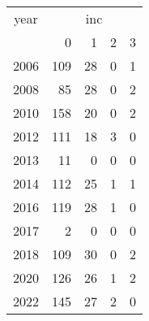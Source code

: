 \footnotesize\begin{tabular}[t]{lrrrr}
\toprule
\multicolumn{1}{c}{year} & \multicolumn{4}{c}{inc} \\
\cmidrule(l{3pt}r{3pt}){1-1} \cmidrule(l{3pt}r{3pt}){2-5}
  & 0 & 1 & 2 & 3\\
\midrule
2006 & 109 & 28 & 0 & 1\\
2008 & 85 & 28 & 0 & 2\\
2010 & 158 & 20 & 0 & 2\\
2012 & 111 & 18 & 3 & 0\\
2013 & 11 & 0 & 0 & 0\\
2014 & 112 & 25 & 1 & 1\\
2016 & 119 & 28 & 1 & 0\\
2017 & 2 & 0 & 0 & 0\\
2018 & 109 & 30 & 0 & 2\\
2020 & 126 & 26 & 1 & 2\\
2022 & 145 & 27 & 2 & 0\\
\bottomrule
\end{tabular}
